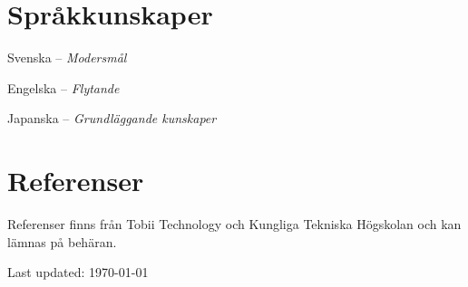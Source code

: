 \documentclass[a4paper]{article}
\def\footerlink{}%
\renewenvironment{itemize}{
  \begin{list}{}{
    \setlength{\leftmargin}{1.5em}
  }
}{
  \end{list}
}
\begin{document}
\section*{Språkkunskaper}

\begin{itemize}
	\item Svenska -- \emph{Modersmål}
	\item Engelska -- \emph{Flytande}
	\item Japanska -- \emph{Grundläggande kunskaper}
\end{itemize}

\section*{Referenser}

\begin{itemize}
	\item Referenser finns från Tobii Technology och Kungliga Tekniska Högskolan och kan lämnas på behäran.
\end{itemize}

\bigskip

\begin{center}
  \begin{footnotesize}
    Last updated: \today \\
    \href{\footerlink}{\texttt{\footerlink}}
  \end{footnotesize}
\end{center}
\end{document}
